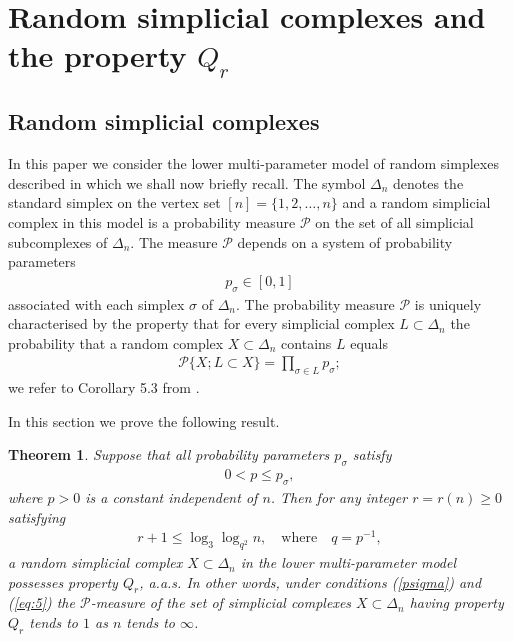\documentclass[11pt,twoside, reqno]{amsart}
\theoremstyle{plain}
\newtheorem{teo}[lema]{Theorem}
\theoremstyle{definition}
\begin{document}
\section{Random simplicial complexes and the property $Q_r$}\label{sec:3}

\subsection{Random simplicial complexes}\label{sec:31} In this paper we consider the lower multi-para\-meter model of random simplexes described in \cite{FMN} which we shall now briefly recall.
The symbol 
$\Delta_n$ denotes the standard simplex on the vertex set $[n]=\{1, 2, \dots, n\}$ and a random simplicial complex in this model is a probability measure 
$\mathcal P$ on the set of all simplicial subcomplexes of $\Delta_n$. The measure 
$\mathcal P$ depends on a system of probability parameters 
\begin{eqnarray*}\label{psigma0}
p_\sigma\in [0,1]
\end{eqnarray*} 
associated with each simplex $\sigma$ of $\Delta_n$. 
The probability measure $\mathcal P$ is uniquely characterised by the property that for every simplicial complex $L\subset \Delta_n$ the probability that a random complex $X\subset \Delta_n$ contains $L$ equals 
\begin{eqnarray}\label{eq:x}
\mathcal P\{X; L\subset X\} = \prod_{\sigma\in L} p_\sigma;
\end{eqnarray}
we refer to Corollary 5.3 from \cite{FMN}. 

In this section we prove the following result. 

\begin{teo}\label{thm8}
Suppose that all probability parameters $p_\sigma$ satisfy 
\begin{eqnarray}\label{psigma}
0<p\le p_\sigma, 
\end{eqnarray}
where $p>0$ is a constant independent of $n$. Then for any integer $r=r(n)\ge 0$ satisfying
\begin{eqnarray}\label{eq:5}
r+1 \le \log_3\log_{q^{2}}n, \quad \mbox{where}\quad q=p^{-1},
\end{eqnarray}
a random simplicial complex $X\subset \Delta_n$ in the lower multi-parameter model possesses property $Q_r$, a.a.s. 
In other words, under conditions (\ref{psigma}) and (\ref{eq:5}) the $\mathcal P$-measure of the set of simplicial complexes $X\subset \Delta_n$ having property $Q_r$ tends to $1$ as $n$ tends to $\infty$.
\end{teo}
\end{document}
